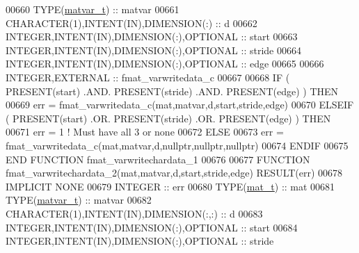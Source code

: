 \begin{DoxyCode}
00660     \textcolor{keywordtype}{TYPE}(\hyperlink{group___m_a_t_structmatvar__t}{matvar\_t})                           :: matvar
00661     \textcolor{keywordtype}{CHARACTER(1)},\textcolor{keywordtype}{INTENT(IN)},\textcolor{keywordtype}{DIMENSION(:)}     :: d
00662     \textcolor{keywordtype}{INTEGER},\textcolor{keywordtype}{INTENT(IN)},\textcolor{keywordtype}{DIMENSION(:)},\textcolor{keywordtype}{OPTIONAL} :: start
00663     \textcolor{keywordtype}{INTEGER},\textcolor{keywordtype}{INTENT(IN)},\textcolor{keywordtype}{DIMENSION(:)},\textcolor{keywordtype}{OPTIONAL} :: stride
00664     \textcolor{keywordtype}{INTEGER},\textcolor{keywordtype}{INTENT(IN)},\textcolor{keywordtype}{DIMENSION(:)},\textcolor{keywordtype}{OPTIONAL} :: edge
00665 
00666     \textcolor{keywordtype}{INTEGER},\textcolor{keywordtype}{EXTERNAL}                         :: fmat\_varwritedata\_c
00667 
00668     \textcolor{keywordflow}{IF} ( \textcolor{keyword}{PRESENT}(start) .AND. \textcolor{keyword}{PRESENT}(stride) .AND. \textcolor{keyword}{PRESENT}(edge) ) \textcolor{keywordflow}{THEN}
00669         err = fmat\_varwritedata\_c(mat,matvar,d,start,stride,edge)
00670     \textcolor{keywordflow}{ELSEIF} ( \textcolor{keyword}{PRESENT}(start) .OR. \textcolor{keyword}{PRESENT}(stride) .OR. \textcolor{keyword}{PRESENT}(edge) ) \textcolor{keywordflow}{THEN}
00671         err = 1    \textcolor{comment}{! Must have all 3 or none}
00672     \textcolor{keywordflow}{ELSE}
00673         err = fmat\_varwritedata\_c(mat,matvar,d,nullptr,nullptr,nullptr)
00674 \textcolor{keywordflow}{    ENDIF}
00675 \textcolor{keyword}{END FUNCTION }fmat\_varwritechardata\_1
00676 
00677 \textcolor{keyword}{FUNCTION }fmat\_varwritechardata\_2(mat,matvar,d,start,stride,edge) \textcolor{keyword}{RESULT}(err)
00678 \textcolor{keywordtype}{IMPLICIT NONE}
00679     \textcolor{keywordtype}{INTEGER}                                  :: err
00680     \textcolor{keywordtype}{TYPE}(\hyperlink{group___m_a_t_gab0fc888f5a5d79943b16284b1f91c2e8}{mat\_t})                              :: mat
00681     \textcolor{keywordtype}{TYPE}(\hyperlink{group___m_a_t_structmatvar__t}{matvar\_t})                           :: matvar
00682     \textcolor{keywordtype}{CHARACTER(1)},\textcolor{keywordtype}{INTENT(IN)},\textcolor{keywordtype}{DIMENSION(:,:)}   :: d
00683     \textcolor{keywordtype}{INTEGER},\textcolor{keywordtype}{INTENT(IN)},\textcolor{keywordtype}{DIMENSION(:)},\textcolor{keywordtype}{OPTIONAL} :: start
00684     \textcolor{keywordtype}{INTEGER},\textcolor{keywordtype}{INTENT(IN)},\textcolor{keywordtype}{DIMENSION(:)},\textcolor{keywordtype}{OPTIONAL} :: stride

\end{DoxyCode}
